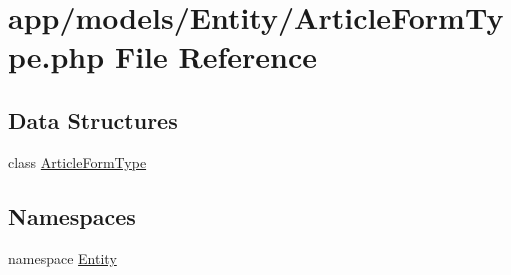\hypertarget{_article_form_type_8php}{\section{app/models/\-Entity/\-Article\-Form\-Type.php File Reference}
\label{_article_form_type_8php}
}
\subsection*{Data Structures}
\begin{DoxyCompactItemize}
\item 
class \hyperlink{class_entity_1_1_article_form_type}{Article\-Form\-Type}
\end{DoxyCompactItemize}
\subsection*{Namespaces}
\begin{DoxyCompactItemize}
\item 
namespace \hyperlink{namespace_entity}{Entity}
\end{DoxyCompactItemize}
